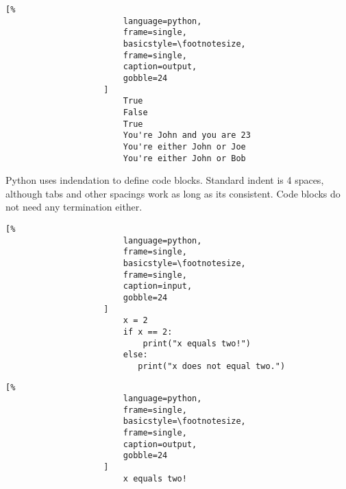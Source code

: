 \documentclass[crop=false,class=article,oneside]{standalone}
\begin{document}
                \begin{minipage}[t]{0.48\textwidth}
                    \begin{lstlisting}[%
                        language=python,
                        frame=single,
                        basicstyle=\footnotesize,
                        frame=single,
                        caption=output,
                        gobble=24
                    ]
                        True
                        False
                        True
                        You're John and you are 23
                        You're either John or Joe
                        You're either John or Bob
                    \end{lstlisting}
                \end{minipage}
                Python uses indendation to define code blocks.
                Standard indent is 4 spaces, although tabs and other
                spacings work as long as its consistent. Code blocks
                do not need any termination either.
                \newpage
                \begin{minipage}[t]{.48\textwidth}
                    \centering
                    \begin{lstlisting}[%
                        language=python,
                        frame=single,
                        basicstyle=\footnotesize,
                        frame=single,
                        caption=input,
                        gobble=24
                    ]
                        x = 2
                        if x == 2:
                            print("x equals two!")
                        else:
                           print("x does not equal two.")
                    \end{lstlisting}
                \end{minipage}\hfill
                \begin{minipage}[t]{.48\textwidth}
                    \centering
                    \begin{lstlisting}[%
                        language=python,
                        frame=single,
                        basicstyle=\footnotesize,
                        frame=single,
                        caption=output,
                        gobble=24
                    ]
                        x equals two!
                    \end{lstlisting}
                \end{minipage}\newline
\end{document}
